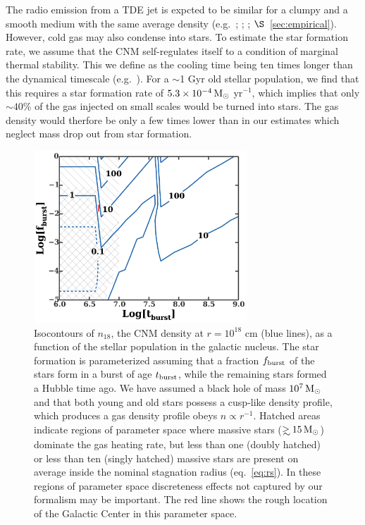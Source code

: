\documentclass[usenatbib,fleqn]{mnras}
\newcommand\gsim{\mathrel{\rlap{\lower4pt\hbox{\hskip1pt$\sim$}}
    \raise1pt\hbox{$>$}}}
\newcommand{\Msun}{{\rm M_\odot}}
\begin{document}
The radio emission from a TDE jet is expcted to be similar for a
clumpy and a smooth medium with the same average density
(e.g.~\citealt{Nakar&Granot2007}; \citealt{Mimica&Giannios2009};
\citealt{vanEerten+2009}; $\S$~\ref{sec:empirical}).  However, cold gas
may also condense into stars.  To estimate the star formation rate, we
assume that the CNM self-regulates itself to a condition of marginal
thermal stability.  This we define as the cooling time being ten times
longer than the dynamical timescale (e.g.~\citealt{McCourt+09}). For a
$\sim$1 Gyr old stellar population, we find that this requires a star
formation rate of $5.3 \times 10^{-4} \,\Msun$ yr$^{-1}$, which
implies that only $\sim 40$\% of the gas injected on small scales
would be turned into stars.  The gas density would therfore be only a
few times lower than in our estimates which neglect mass drop out from
star formation.

\begin{figure} 
  \includegraphics[width=8cm]{cnm_plot.pdf}
  \caption{\label{fig:param} Isocontours of $n_{18}$, the CNM density
    at $r = 10^{18}$ cm (blue lines), as a function of the stellar
    population in the galactic nucleus.  The star formation is
    parameterized assuming that a fraction $f_{\rm burst}$ of the
    stars form in a burst of age $t_{\rm burst}$, while the remaining
    stars formed a Hubble time ago.  We have assumed a black hole of
    mass $10^{7} \, \Msun$ and that both young and old stars possess a
    cusp-like density profile, which produces a gas density profile
    obeys $n \propto r^{-1}$.  Hatched areas indicate regions of
    parameter space where massive stars ($\gsim 15 \, \Msun$) dominate
    the gas heating rate, but less than one (doubly hatched) or less
    than ten (singly hatched) massive stars are present on average
    inside the nominal stagnation radius (eq.~\ref{eq:rs}).  In these
    regions of parameter space discreteness effects not captured by
    our formalism may be important. The red line shows the rough location of
    the Galactic Center in this parameter space.}
\end{figure}
\end{document}
